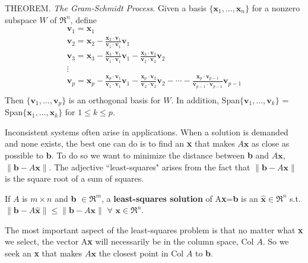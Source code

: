 \documentclass{article}
\begin{document}
\hfill \newline THEOREM. \textit{The Gram-Schmidt Process}. Given a basis $\{\textbf{x}_1,\dots,\textbf{x}_n\}$ for a nonzero subspace $W$ of $\Re^n$, define
\begin{equation}
\begin{split}
    \textbf{v}_1 = \textbf{x}_1 \\
    \textbf{v}_2 = \textbf{x}_2 - \frac{\textbf{x}_2 \cdot \textbf{v}_1}{\textbf{v}_1 \cdot \textbf{v}_1}\textbf{v}_1 \\
    \textbf{v}_3 = \textbf{x}_3 - \frac{\textbf{x}_3 \cdot \textbf{v}_1}{\textbf{v}_1 \cdot \textbf{v}_1}\textbf{v}_1  - \frac{\textbf{x}_3 \cdot \textbf{v}_2}{\textbf{v}_2 \cdot \textbf{v}_2}\textbf{v}_2 \\
    \vdots \\
    \textbf{v}_p = \textbf{x}_p - \frac{\textbf{x}_p \cdot \textbf{v}_1}{\textbf{v}_1 \cdot \textbf{v}_1}\textbf{v}_1  - \frac{\textbf{x}_p \cdot \textbf{v}_2}{\textbf{v}_2 \cdot \textbf{v}_2}\textbf{v}_2 - \cdots - \frac{\textbf{x}_p \cdot \textbf{v}_{p-1}}{\textbf{v}_{p-1} \cdot \textbf{v}_{p-1}}\textbf{v}_{p-1} \\
\end{split}
\end{equation}
\noindent Then $\{\textbf{v}_1,\dots,\textbf{v}_p\}$ is an orthogonal basis for $W$. In addition, Span$\{\textbf{v}_1,\dots,\textbf{v}_k\}$ = Span$\{\textbf{x}_1,\dots,\textbf{x}_k\}$ for $1 \leq k \leq p$.

\hfill \newline Inconsistent systems often arise in applications. When a solution is demanded and none exists, the best one can do is to find an \textbf{x} that makes $A\textbf{x}$ as close as possible to $\textbf{b}$. To do so we want to minimize the distance between \textbf{b} and $A\textbf{x}$, $\|\textbf{b}-A\textbf{x}\|$. The adjective ``least-squares" arises from the fact that $\|\textbf{b}-A\textbf{x}\|$ is the square root of a sum of squares.

\hfill \newline If $A$ is $m \times n$ and \textbf{b} $\in \Re^m$, a \textbf{least-squares solution} of A\textbf{x}=\textbf{b} is an $\hat{\textbf{x}} \in \Re^n$ s.t. $\|\textbf{b}-A\hat{\textbf{x}}\| \leq \|\textbf{b}-A\textbf{x}\|$ $\forall$ $\textbf{x} \in \Re^n$.

\hfill \newline The most important aspect of the least-squares problem is that no matter what \textbf{x} we select, the vector A\textbf{x} will necessarily be in the column space, Col $A$. So we seek an \textbf{x} that makes $A\textbf{x}$ the closest point in Col $A$ to \textbf{b}.
\end{document}
